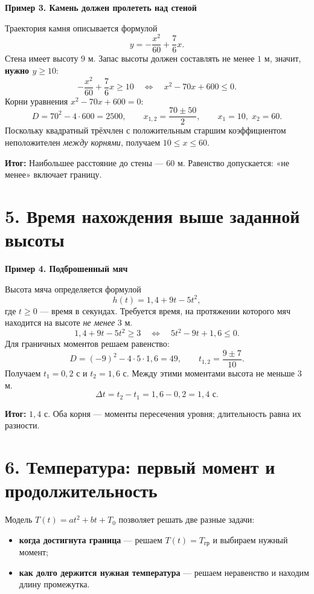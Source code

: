 \documentclass[a4paper,12pt]{article}
\newcommand{\idea}[1]{\textcolor{darkaccent}{\textbf{#1}}}
\newcommand{\result}[1]{\textcolor{darkaccent}{\textbf{Итог:}} #1}
\newcommand{\ex}[2]{\vspace{4pt}\noindent\textcolor{darkaccent}{\textbf{Пример #1. #2}}\par\nopagebreak[3]}
\newcommand{\sectionline}{\par\vspace{-1mm}{\color{accent}\hrule height .45pt}\vspace{4mm}}
\newcommand{\sect}[2]{\section*{\textcolor{darkaccent}{#1. #2}}\sectionline}
\begin{document}
\ex{3}{Камень должен пролететь над стеной}
Траектория камня описывается формулой
\[
 y=-\frac{x^2}{60}+\frac76x.
\]
Стена имеет высоту $9$ м. Запас высоты должен составлять не менее $1$ м, значит, \idea{нужно $y\ge10$}:
\[
 -\frac{x^2}{60}+\frac76x\ge10
 \quad\Longleftrightarrow\quad x^2-70x+600\le0.
\]
Корни уравнения $x^2-70x+600=0$:
\[
 D=70^2-4\cdot600=2500,\qquad
 x_{1,2}=\frac{70\pm50}{2},\qquad x_1=10,\;x_2=60.
\]
Поскольку квадратный трёхчлен с положительным старшим коэффициентом неположителен \emph{между корнями}, получаем $10\le x\le60$.

\result{Наибольшее расстояние до стены --- $60$ м. Равенство допускается: «не менее» включает границу.}

\clearpage
\sect{5}{Время нахождения выше заданной высоты}
\ex{4}{Подброшенный мяч}
Высота мяча определяется формулой
\[
 h(t)=1{,}4+9t-5t^2,
\]
где $t\ge0$ --- время в секундах. Требуется время, на протяжении которого мяч находится на высоте \emph{не менее} $3$ м.
\[
 1{,}4+9t-5t^2\ge3
 \quad\Longleftrightarrow\quad 5t^2-9t+1{,}6\le0.
\]
Для граничных моментов решаем равенство:
\[
 D=(-9)^2-4\cdot5\cdot1{,}6=49,\qquad
 t_{1,2}=\frac{9\pm7}{10}.
\]
Получаем $t_1=0{,}2$ с и $t_2=1{,}6$ с. Между этими моментами высота не меньше $3$ м.
\[
 \Delta t=t_2-t_1=1{,}6-0{,}2=1{,}4\text{ с}.
\]
\begin{center}
\end{center}
\result{$1{,}4$ с. Оба корня --- моменты пересечения уровня; длительность равна их разности.}

\clearpage
\sect{6}{Температура: первый момент и продолжительность}
Модель $T(t)=at^2+bt+T_0$ позволяет решать две разные задачи:
\begin{itemize}
\item \idea{когда достигнута граница} --- решаем $T(t)=T_{\text{гр}}$ и выбираем нужный момент;
\item \idea{как долго держится нужная температура} --- решаем неравенство и находим длину промежутка.
\end{itemize}
\end{document}
